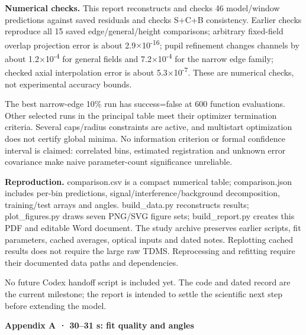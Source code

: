 \documentclass[10pt,a4paper]{article}
\newcommand{\heading}[1]{{\sffamily\Large\bfseries\color{ink}#1}\par\vspace{7pt}}
\begin{document}
\textbf{Numerical checks.} This report reconstructs and checks 46 model/window predictions against saved residuals and checks S+C+B consistency. Earlier checks reproduce all 15 saved edge/general/height comparisons; arbitrary fixed-field overlap projection error is about 2.9\(\times\)10\textsuperscript{-16}; pupil refinement changes channels by about 1.2\(\times\)10\textsuperscript{-4} for general fields and 7.2\(\times\)10\textsuperscript{-4} for the narrow edge family; checked axial interpolation error is about 5.3\(\times\)10\textsuperscript{-7}. These are numerical checks, not experimental accuracy bounds.\par
The best narrow-edge 10\% run has success=false at 600 function evaluations. Other selected runs in the principal table meet their optimizer termination criteria. Several caps/radius constraints are active, and multistart optimization does not certify global minima. No information criterion or formal confidence interval is claimed: correlated bins, estimated registration and unknown error covariance make naive parameter-count significance unreliable.\par
\textbf{Reproduction.} comparison.csv is a compact numerical table; comparison.json includes per-bin predictions, signal/interference/background decomposition, training/test arrays and angles. build\_data.py reconstructs results; plot\_figures.py draws seven PNG/SVG figure sets; build\_report.py creates this PDF and editable Word document. The study archive preserves earlier scripts, fit parameters, cached averages, optical inputs and dated notes. Replotting cached results does not require the large raw TDMS. Reprocessing and refitting require their documented data paths and dependencies.\par
No future Codex handoff script is included yet. The code and dated record are the current milestone; the report is intended to settle the scientific next step before extending the model.\par
\clearpage
\heading{Appendix A · 30–31 s: fit quality and angles}
\end{document}
